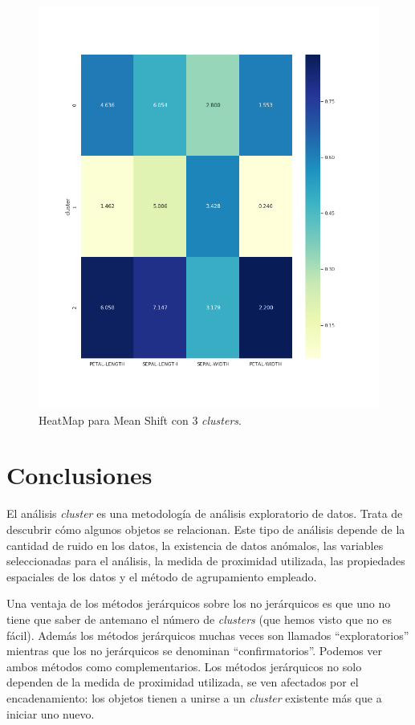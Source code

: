 \documentclass[a4paper, 20pt]{article}
\begin{document}
\begin{figure}[h]
\centering
\includegraphics[scale=0.62]{dani/heatmapMeanShiftIRIS.png}
\caption{HeatMap para Mean Shift con 3 \textit{clusters}.}
\label{hmms}
\end{figure}

\clearpage

\section{Conclusiones}
El análisis \textit{cluster} es una metodología de análisis exploratorio de datos. Trata de descubrir cómo algunos objetos se relacionan. Este tipo de análisis depende de la cantidad de ruido en los datos, la existencia de datos anómalos, las variables seleccionadas para el análisis, la medida de proximidad utilizada, las propiedades espaciales de los datos y el método de agrupamiento empleado.

Una ventaja de los métodos jerárquicos sobre los no jerárquicos es que uno no tiene que saber de antemano el número de \textit{clusters} (que hemos visto que no es fácil). Además los métodos jerárquicos muchas veces son llamados ``exploratorios'' mientras que los no jerárquicos se denominan ``confirmatorios''. Podemos ver ambos métodos como complementarios. Los métodos jerárquicos no solo dependen de la medida de proximidad utilizada, se ven afectados por el encadenamiento: los objetos tienen a unirse a un \textit{cluster} existente más que a iniciar uno nuevo.
\end{document}

